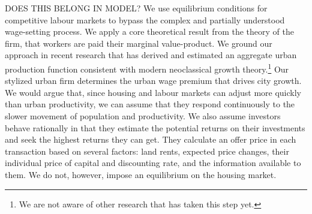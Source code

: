 





{\color{red} DOES THIS BELONG IN MODEL? We use equilibrium conditions for competitive labour markets to bypass the complex and partially understood wage-setting process. We apply a core theoretical result from the theory of the firm, that workers are paid their \gls{marginal value-product}. We ground our approach in recent research that has derived and estimated an aggregate urban production function consistent with modern \gls{neoclassical growth theory}.\footnote{We are not aware of other research that has taken this step yet.} Our stylized urban firm determines the urban wage premium that drives city growth. We would argue that, since housing and labour markets can adjust more quickly than urban productivity, we can assume that they respond continuously to the slower movement of population and productivity. %
We also assume investors behave rationally in that they estimate the potential returns on their investments and seek the highest returns they can get. They calculate an offer price in each transaction based on several factors: land rents, expected price changes, their individual price of capital and discounting rate, and the information available to them. We do not, however, impose an equilibrium on the housing market.
}
